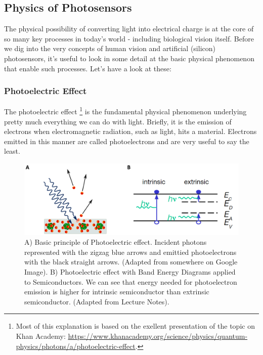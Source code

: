 \subsection{Physics of Photosensors}

The physical possibility of converting light into electrical charge is at the core of so many key processes in today's world - including biological vision itself. Before we dig into the very concepts of human vision and artificial (silicon) photosensors, it's useful to look in some detail at the basic physical phenomenon that enable such processes. Let's have a look at these:

\subsubsection{Photoelectric Effect}

The photoelectric effect \footnote{Most of this explanation is based on the exellent presentation of the topic on Khan Academy: \url{https://www.khanacademy.org/science/physics/quantum-physics/photons/a/photoelectric-effect}.} is the fundamental physical phenomenon underlying pretty much everything we can do with light. Briefly, it is the emission of electrons when electromagnetic radiation, such as light, hits a material. Electrons emitted in this manner are called photoelectrons and are very useful to say the least. 

\begin{figure}[H]
    \centering
    \includegraphics[width=0.9\linewidth]{../../Figures/PhotoElectricEffect.PNG}
    \caption{A) Basic principle of Photoelectric effect. Incident photons represented with the zigzag blue arrows and emittied photoelectrons with the black straight arrows. (Adapted from somewhere on Google Image). B) Photoelectric effect with Band Energy Diagrams applied to Semiconductors. We can see that energy needed for photoelectron emission is higher for intrinsic semiconductor than extrinsic semiconductor. (Adapted from Lecture Notes).}
    \label{fig:PhotoElectricEffect}
\end{figure}

